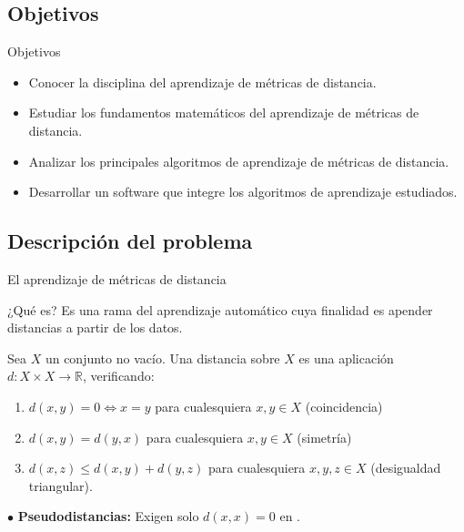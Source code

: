 \documentclass[10pt, compress]{beamer}
\newcommand\R{\mathbb{R}}
\newcommand\itemref[1]{{\renewcommand{\insertenumlabel}{\ref{#1}}%
  \usebeamertemplate{enumerate item}}}
\begin{document}
\subsection{Objetivos}

\begin{frame}{Objetivos}

\begin{itemize}

  \item Conocer la disciplina del aprendizaje de métricas de distancia.

  \item Estudiar los fundamentos matemáticos del aprendizaje de métricas de distancia.

  \item Analizar los principales algoritmos de aprendizaje de métricas de distancia.

  \item Desarrollar un software que integre los algoritmos de aprendizaje estudiados. 

\end{itemize}

\end{frame}


\subsection{Descripción del problema}

\begin{frame}{El aprendizaje de métricas de distancia}

\begin{block}{¿Qué es?}
  Es una rama del aprendizaje automático cuya finalidad es apender distancias a partir de los datos.

\end{block}

\begin{definition}
  Sea $X$ un conjunto no vacío. Una distancia sobre $X$ es una aplicación $d \colon X \times X \to \R$, verificando:
  \begin{enumerate}
    \item $d(x,y) = 0 \iff x = y$ para cualesquiera $x, y \in X$ (coincidencia) \label{item:dist:1}
    \item $d(x,y) = d(y,x)$ para cualesquiera $x, y \in X$ (simetría)
    \item $d(x,z) \le d(x,y) + d(y,z)$ para cualesquiera $x,y,z \in X$ (desigualdad triangular).
  \end{enumerate}
  $\bullet$ \textbf{Pseudodistancias: } Exigen solo $d(x,x) = 0$ en \itemref{item:dist:1}.
\end{definition}

\end{frame}
\end{document}
